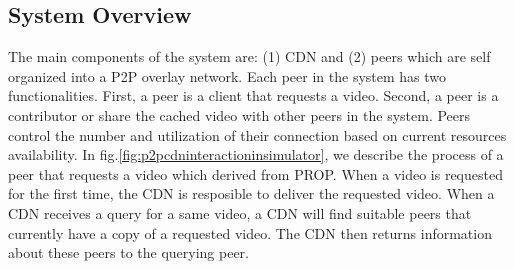 \documentclass[10pt,final,journal,a4paper]{IEEEtran}
\begin{document}
\subsection{System Overview}\label{systemoverview}
The main components of the system are: (1) CDN and (2) peers which are self organized into a P2P overlay network.
Each peer in the system has two functionalities.
First, a peer is a client that requests a video. 
Second, a peer is a contributor or share the cached video with other peers in the system. 
Peers control the number and utilization of their connection based on current resources availability.
In fig.\ref{fig:p2pcdninteractioninsimulator}, we describe the process of a peer that requests a video which derived from PROP.
When a video is requested for the first time, the CDN is resposible to deliver the requested video.
When a CDN receives a query for a same video, a CDN will find suitable peers that currently have a copy of a requested video.
The CDN then returns information about these peers to the querying peer.
\end{document}
